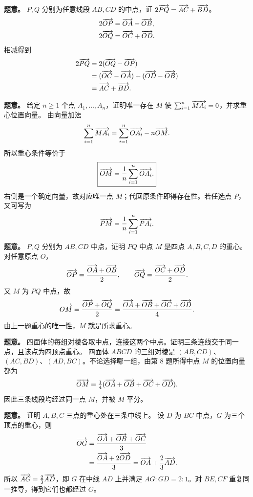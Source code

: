 \textbf{题意。} $P,Q$ 分别为任意线段 $AB,CD$ 的中点，证 $2\V{PQ}=\V{AC}+\V{BD}$。
\begin{align*}
2\V{OP}&=\V{OA}+\V{OB},\\
2\V{OQ}&=\V{OC}+\V{OD}.
\end{align*}
相减得到
\begin{align*}
2\V{PQ}&=2(\V{OQ}-\V{OP})\\
&=(\V{OC}-\V{OA})+(\V{OD}-\V{OB})\\
&=\V{AC}+\V{BD}.
\end{align*}

\textbf{题意。} 给定 $n\ge1$ 个点 $A_1,\ldots,A_n$，证明唯一存在 $M$ 使 $\sum_{i=1}^n\V{MA_i}=0$，并求重心位置向量。
由向量加法
\[
\sum_{i=1}^n\V{MA_i}=\sum_{i=1}^n\V{OA_i}-n\V{OM}.
\]
所以重心条件等价于
\[
\boxed{\V{OM}=\frac1n\sum_{i=1}^n\V{OA_i}.}
\]
右侧是一个确定向量，故对应唯一点 $M$；代回原条件即得存在性。若任选点 $P$，又可写为
\[
\V{PM}=\frac1n\sum_{i=1}^n\V{PA_i}.
\]

\textbf{题意。} $P,Q$ 分别为 $AB,CD$ 中点，证明 $PQ$ 中点 $M$ 是四点 $A,B,C,D$ 的重心。
对任意原点 $O$，
\[
\V{OP}=\frac{\V{OA}+\V{OB}}2,\qquad
\V{OQ}=\frac{\V{OC}+\V{OD}}2.
\]
又 $M$ 为 $PQ$ 中点，故
\[
\V{OM}=\frac{\V{OP}+\V{OQ}}2
=\frac{\V{OA}+\V{OB}+\V{OC}+\V{OD}}4.
\]
由上一题重心的唯一性，$M$ 就是所求重心。

\textbf{题意。} 四面体的每组对棱各取中点，连接这两个中点。证明三条连线交于同一点，且该点为四顶点重心。
四面体 $ABCD$ 的三组对棱是 $(AB,CD)$、$(AC,BD)$、$(AD,BC)$。不论选择哪一组，由第 8 题所得中点 $M$ 的位置向量都为
\[
\V{OM}=\tfrac14(\V{OA}+\V{OB}+\V{OC}+\V{OD}).
\]
因此三条线段均经过同一点 $M$，并被 $M$ 平分。

\textbf{题意。} 证明 $A,B,C$ 三点的重心处在三条中线上。
设 $D$ 为 $BC$ 中点，$G$ 为三个顶点的重心，则
\begin{align*}
\V{OG}&=\frac{\V{OA}+\V{OB}+\V{OC}}3\\
&=\frac{\V{OA}+2\V{OD}}3
=\V{OA}+\frac23\V{AD}.
\end{align*}
所以 $\V{AG}=\frac23\V{AD}$，即 $G$ 在中线 $AD$ 上并满足 $AG:GD=2:1$。对 $BE,CF$ 重复同一推导，得到它们也都经过 $G$。

